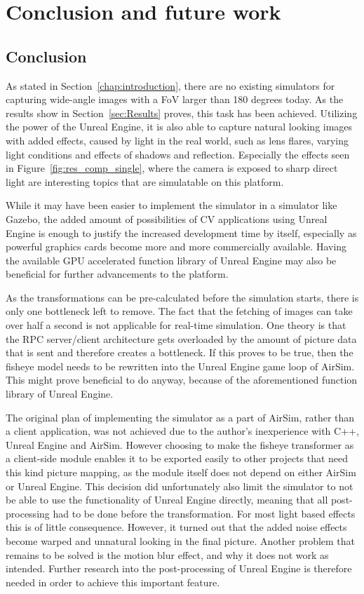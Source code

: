 
\chapter{Conclusion and future work}
\section{Conclusion}
As stated in Section~\ref{chap:introduction}, there are no existing simulators for capturing wide-angle images with a FoV larger than 180 degrees today. As the results show in Section~\ref{sec:Results} proves, this task has been achieved. Utilizing the power of the Unreal Engine, it is also able to capture natural looking images with added effects, caused by light in the real world, such as lens flares, varying light conditions and effects of shadows and reflection. Especially the effects seen in Figure~\ref{fig:res_comp_single}, where the camera is exposed to sharp direct light are interesting topics that are simulatable on this platform.

While it may have been easier to implement the simulator in a simulator like Gazebo, the added amount of possibilities of CV applications using Unreal Engine is enough to justify the increased development time by itself, especially as powerful graphics cards become more and more commercially available. Having the available GPU accelerated function library of Unreal Engine may also be beneficial for further advancements to the platform.

As the transformations can be pre-calculated before the simulation starts, there is only one bottleneck left to remove. The fact that the fetching of images can take over half a second is not applicable for real-time simulation. One theory is that the RPC server/client architecture gets overloaded by the amount of picture data that is sent and therefore creates a bottleneck. If this proves to be true, then the fisheye model needs to be rewritten into the Unreal Engine game loop of AirSim. This might prove beneficial to do anyway, because of the aforementioned function library of Unreal Engine.

The original plan of implementing the simulator as a part of AirSim, rather than a client application, was not achieved due to the author's inexperience with C++, Unreal Engine and AirSim. However choosing to make the fisheye transformer as a client-side module enables it to be exported easily to other projects that need this kind picture mapping, as the module itself does not depend on either AirSim or Unreal Engine. This decision did unfortunately also limit the simulator to not be able to use the functionality of Unreal Engine directly, meaning that all post-processing had to be done before the transformation. For most light based effects this is of little consequence. However, it turned out that the added noise effects become warped and unnatural looking in the final picture. Another problem that remains to be solved is the motion blur effect, and why it does not work as intended. Further research into the post-processing of Unreal Engine is therefore needed in order to achieve this important feature. 

